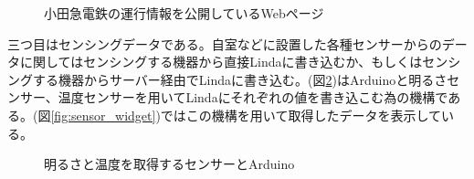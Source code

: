 \begin{figure}[htbp]
  \begin{minipage}{\hsize}
    \begin{center}
    \end{center}
    \caption{小田急電鉄の運行情報を公開しているWebページ}
    \label{fig:odakyu_page}
  \end{minipage}
\end{figure}

三つ目はセンシングデータである。自室などに設置した各種センサーからのデータに関してはセンシングする機器から直接Lindaに書き込むか、もしくはセンシングする機器からサーバー経由でLindaに書き込む。(図\ref{fig:arduino_sensor})はArduinoと明るさセンサー、温度センサーを用いてLindaにそれぞれの値を書き込こむ為の機構である。(図\ref{fig:sensor_widget})ではこの機構を用いて取得したデータを表示している。

\begin{figure}[htbp]
  \begin{minipage}{\hsize}
    \begin{center}
    \end{center}
    \caption{明るさと温度を取得するセンサーとArduino}
    \label{fig:arduino_sensor}
  \end{minipage}
\end{figure}

